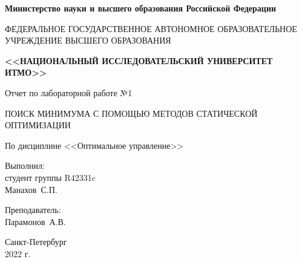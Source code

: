 \begin{titlepage}
	\begin{center}
		\begin{small}
			\textbf{Министерство науки и высшего образования Российской Федерации}

			ФЕДЕРАЛЬНОЕ ГОСУДАРСТВЕННОЕ АВТОНОМНОЕ ОБРАЗОВАТЕЛЬНОЕ УЧРЕЖДЕНИЕ ВЫСШЕГО ОБРАЗОВАНИЯ
			
			\textbf{<<НАЦИОНАЛЬНЫЙ ИССЛЕДОВАТЕЛЬСКИЙ УНИВЕРСИТЕТ ИТМО>>}
		\end{small}
		
		\vspace{8em}
		
		Отчет по лабораторной работе №1
		
		ПОИСК МИНИМУМА С ПОМОЩЬЮ МЕТОДОВ СТАТИЧЕСКОЙ ОПТИМИЗАЦИИ
		
		По дисциплине <<Оптимальное управление>>
	\end{center}
	
	\vspace{8em}
	
	\begin{flushright}
		Выполнил:\\
		студент группы R42331c\\
		Манахов~С.П.
		
		\vspace{1em}
		
		Преподаватель:\\
		Парамонов~А.В.
	\end{flushright}

	\vfill
	
	\begin{center}
		\small
		Санкт-Петербург\\
		2022 г.\\
	\end{center}
\end{titlepage}